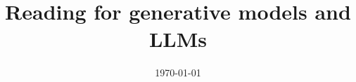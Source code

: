\documentclass[letterpaper,11pt,reqno]{amsart}
\begin{document}
\title{Reading for generative models and LLMs}
\date{\today}
\maketitle

\cite{brown2020language,bender2021dangers,frieder2024mathematical,rombach2022high,longpre2023flan,radford2019language,zhang2023multimodal,friston2024designing,hu2021lora,ruiz2023dreambooth,touvron2023llama,gao2020pile,zhang2023adding,hsieh2023distilling,pryzant2023automatic,sun2023pearl,jiang2023mistral,murthy2023rex,zhang2023survey,lewis2020retrieval,cai2022recent,parvez2021retrieval,park2015speclda,hinton1995wake,pouplin2024retrieval,he2024g,wang2022self}




\end{document}
